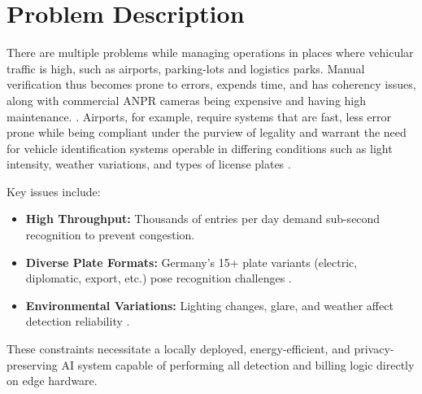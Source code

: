 \section{Problem Description}
There are multiple problems while managing operations in places where vehicular traffic is high, such as airports, parking-lots and logistics parks. Manual verification thus becomes prone to errors, expends time, and has coherency issues, along with commercial \ac{ANPR} cameras being expensive and having high maintenance.  \cite{netinant2024evaluating}. Airports, for example,  require systems that are fast, less error prone while being compliant under the purview of legality and warrant the need for vehicle identification systems operable in differing conditions such as light intensity, weather variations, and types of license plates \cite{fraportALPR, munichALPR}.

Key issues include:
\begin{itemize}
	\item \textbf{High Throughput:} Thousands of entries per day demand sub-second recognition to prevent congestion.
	\item \textbf{Diverse Plate Formats:} Germany’s 15+ plate variants (electric, diplomatic, export, etc.) pose recognition challenges \cite{mufti2021automatic}.
	\item \textbf{Environmental Variations:} Lighting changes, glare, and weather affect detection reliability \cite{plavac2024performance}.
\end{itemize}

These constraints necessitate a locally deployed, energy-efficient, and privacy-preserving \ac{AI} system capable of performing all detection and billing logic directly on edge hardware.

